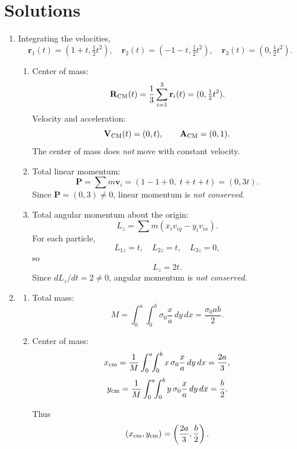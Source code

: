 \documentclass[../main.tex]{subfiles}
\begin{document}
\maketitle

\section*{Solutions}

\begin{enumerate}

\item Integrating the velocities,
\[
\mathbf r_1(t)=(1+t,\tfrac12 t^2),\quad
\mathbf r_2(t)=(-1-t,\tfrac12 t^2),\quad
\mathbf r_3(t)=(0,\tfrac12 t^2).
\]

\begin{enumerate}
\item[(a)] Center of mass:
\[
\mathbf R_{\rm CM}(t)=\frac{1}{3}\sum_{i=1}^3 \mathbf r_i(t)
=(0,\tfrac12 t^2).
\]
Velocity and acceleration:
\[
\mathbf V_{\rm CM}(t)=(0,t),\qquad
\mathbf A_{\rm CM}=(0,1).
\]
The center of mass does \emph{not} move with constant velocity.

\item[(b)] Total linear momentum:
\[
\mathbf P=\sum m\mathbf v_i
=(1-1+0,\; t+t+t)=(0,3t).
\]
Since \(\dot{\mathbf P}=(0,3)\neq 0\), linear momentum is \emph{not conserved}.

\item[(c)] Total angular momentum about the origin:
\[
L_z=\sum m(x_i v_{iy}-y_i v_{ix}).
\]
For each particle,
\[
L_{1z}=t,\quad L_{2z}=t,\quad L_{3z}=0,
\]
so
\[
L_z=2t.
\]
Since \(dL_z/dt=2\neq0\), angular momentum is \emph{not conserved}.
\end{enumerate}

\item
\begin{enumerate}
\item[(a)] Total mass:
\[
M=\int_0^a\!\!\int_0^b \sigma_0\frac{x}{a}\,dy\,dx
=\frac{\sigma_0 ab}{2}.
\]

\item[(b)] Center of mass:
\[
x_{\rm cm}=\frac{1}{M}\int_0^a\!\!\int_0^b x\,\sigma_0\frac{x}{a}\,dy\,dx
=\frac{2a}{3},
\]
\[
y_{\rm cm}=\frac{1}{M}\int_0^a\!\!\int_0^b y\,\sigma_0\frac{x}{a}\,dy\,dx
=\frac{b}{2}.
\]

Thus
\[
(x_{\rm cm},y_{\rm cm})=\left(\frac{2a}{3},\frac{b}{2}\right).
\]
\end{enumerate}

\end{enumerate}
\end{document}
